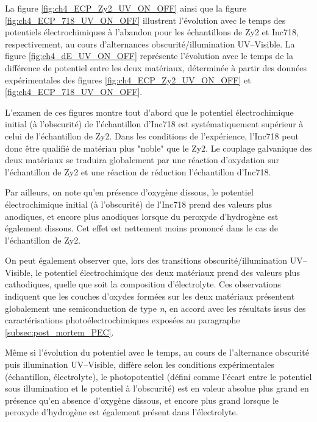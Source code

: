 \begin{refsection}
    La figure \ref{fig:ch4_ECP_Zy2_UV_ON_OFF} ainsi que la figure \ref{fig:ch4_ECP_718_UV_ON_OFF} 
    illustrent l’évolution avec le temps des potentiels électrochimiques à
    l’abandon pour les échantillons de Zy2 et Inc718, respectivement, au cours d’alternances obscurité/illumination
    UV--Visible. La figure \ref{fig:ch4_dE_UV_ON_OFF} représente l’évolution avec le temps de la différence de potentiel entre les deux
    matériaux, déterminée à partir des données expérimentales des figures \ref{fig:ch4_ECP_Zy2_UV_ON_OFF} et \ref{fig:ch4_ECP_718_UV_ON_OFF}.
    

    L’examen de ces figures montre tout d’abord que le potentiel électrochimique initial (à l’obscurité) de
    l’échantillon d’Inc718 est systématiquement supérieur à celui de l’échantillon de Zy2. Dans les conditions de
    l’expérience, l’Inc718 peut donc être qualifié de matériau plus "noble" que le Zy2. Le couplage galvanique des
    deux matériaux se traduira globalement par une réaction d’oxydation sur l’échantillon de Zy2 et une réaction de
    réduction l’échantillon d’Inc718.
    
    Par ailleurs, on note qu’en présence d’oxygène dissous, le potentiel électrochimique initial (à l’obscurité) de
    l’Inc718 prend des valeurs plus anodiques, et encore plus anodiques lorsque du peroxyde d’hydrogène est également
    dissous. Cet effet est nettement moins prononcé dans le cas de l’échantillon de Zy2. 
    
    On peut également observer que, lors des transitions obscurité/illumination UV--Visible, le potentiel électrochimique
    des deux matériaux prend des valeurs plus cathodiques, quelle que soit la composition d’électrolyte. Ces
    observations indiquent que les couches d’oxydes formées sur les deux matériaux présentent globalement une
    semiconduction de type \emph{n}, en accord avec les résultats issus des caractérisations photoélectrochimiques exposées au
    paragraphe \ref{subsec:post_mortem_PEC}.


    Même si l’évolution du potentiel avec le temps, au cours de l’alternance obscurité puis illumination UV--Visible, diffère
    selon les conditions expérimentales (échantillon, électrolyte), le photopotentiel (défini comme l’écart entre le
    potentiel sous illumination et le potentiel à l’obscurité) est en valeur absolue plus grand en présence qu’en
    absence d’oxygène dissous, et encore plus grand lorsque le peroxyde d’hydrogène est également présent dans
    l’électrolyte.
    

\end{refsection}

